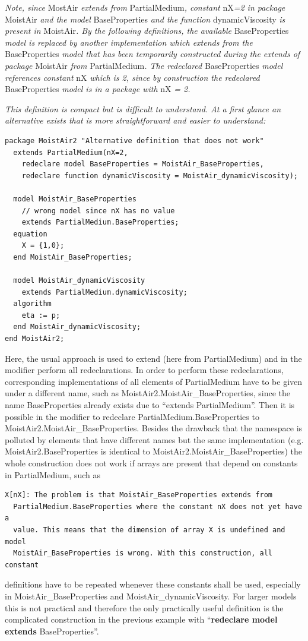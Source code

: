 \documentclass[10pt,a4paper]{report}
\begin{document}
\emph{Note, since} MostAir \emph{extends from} PartialMedium\emph{,
constant} nX\emph{=2 in package} MoistAir \emph{and the model}
BaseProperties \emph{and the function} dynamicViscosity \emph{is present
in} MoistAir\emph{. By the following definitions, the available}
BaseProperties \emph{model is replaced by another implementation which
extends from the} BaseProperties \emph{model that has been temporarily
constructed during the extends of package} MoistAir \emph{from}
PartialMedium\emph{. The redeclared} BaseProperties \emph{model
references constant} nX \emph{which is 2, since by construction the
redeclared} BaseProperties \emph{model is in a package with} nX \emph{=
2.}

\emph{This definition is compact but is difficult to understand. At a
first glance an alternative exists that is more straightforward and
easier to understand: }
\begin{lstlisting}[language=modelica]
package MoistAir2 "Alternative definition that does not work"
  extends PartialMedium(nX=2,
    redeclare model BaseProperties = MoistAir_BaseProperties,
    redeclare function dynamicViscosity = MoistAir_dynamicViscosity);
    
  model MoistAir_BaseProperties
    // wrong model since nX has no value
    extends PartialMedium.BaseProperties;
  equation 
    X = {1,0};
  end MoistAir_BaseProperties;

  model MoistAir_dynamicViscosity
    extends PartialMedium.dynamicViscosity;
  algorithm 
    eta := p;
  end MoistAir_dynamicViscosity;
end MoistAir2;
\end{lstlisting}

Here, the usual approach is used to extend (here from PartialMedium) and
in the modifier perform all redeclarations. In order to perform these
redeclarations, corresponding implementations of all elements of
PartialMedium have to be given under a different name, such as
MoistAir2.MoistAir\_BaseProperties, since the name BaseProperties
already exists due to ``extends PartialMedium''. Then it is possible in
the modifier to redeclare PartialMedium.BaseProperties to
MoistAir2.MoistAir\_BaseProperties. Besides the drawback that the
namespace is polluted by elements that have different names but the same
implementation (e.g. MoistAir2.BaseProperties is identical to
MoistAir2.MoistAir\_BaseProperties) the whole construction does not work
if arrays are present that depend on constants in PartialMedium, such as
\begin{lstlisting}[language=modelica]
  X[nX]: The problem is that MoistAir_BaseProperties extends from
  PartialMedium.BaseProperties where the constant nX does not yet have a
  value. This means that the dimension of array X is undefined and model
  MoistAir_BaseProperties is wrong. With this construction, all constant
\end{lstlisting}
definitions have to be repeated whenever these constants shall be used,
especially in MoistAir\_BaseProperties and MoistAir\_dynamicViscosity.
For larger models this is not practical and therefore the only
practically useful definition is the complicated construction in the
previous example with ``\textbf{redeclare model extends}
BaseProperties''.
\end{document}
